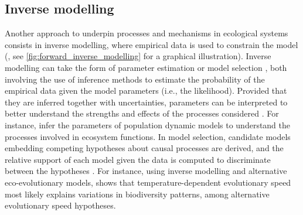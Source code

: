 \subsection{Inverse modelling}
Another approach to underpin processes and mechanisms in ecological systems consists in inverse modelling, where empirical data is used to constrain the model (\cite{Clermont2015}, see \cref{fig:forward_inverse_modelling} for a graphical illustration).
% 
% 
% 
Inverse modelling can take the form of parameter estimation \citep{Schartau2017} or model selection \citep{Johnson2004}, both involving the use of inference methods to estimate the probability of the empirical data given the model parameters (i.e., the likelihood).
% 
% 
% 
% 
Provided that they are inferred together with uncertainties, parameters can be interpreted to better understand the strengths and effects of the processes considered \citep{Pontarp2019}. For instance, \cite{Higgins2010,Curtsdotter2019} infer the parameters of population dynamic models to understand the processes involved in ecosystem functions.
%
In model selection, candidate models embedding competing hypotheses about causal processes are derived, and the relative support of each model given the data is computed to discriminate between the hypotheses \citep{Johnson2004}. For instance, using inverse modelling and alternative eco-evolutionary models, \citep{Skeels2022} shows that temperature-dependent evolutionary speed most likely explains variations in biodiversity patterns, among alternative evolutionary speed hypotheses.

